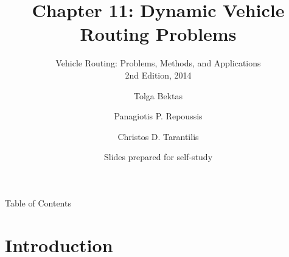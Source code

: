 \documentclass[aspectratio=169,10pt]{beamer}
\title[Dynamic VRP]{Chapter 11: Dynamic Vehicle Routing Problems}
\subtitle{Vehicle Routing: Problems, Methods, and Applications\\
          2nd Edition, 2014}
\author{Tolga Bektas \and Panagiotis P. Repoussis \and Christos D. Tarantilis}
\date{Slides prepared for self-study}
\institute[VRP Lectures]{Vehicle Routing Lecture Series}
\begin{document}

\begin{frame}
  \titlepage
\end{frame}

\begin{frame}[allowframebreaks]{Table of Contents}
  \tableofcontents
\end{frame}

\section{Introduction}
\end{document}
